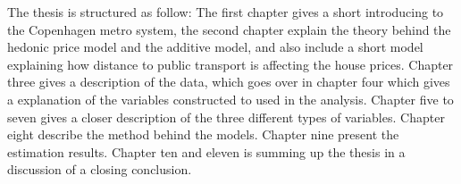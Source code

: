 The thesis is structured as follow: The first chapter gives a short introducing 
to the Copenhagen metro system, the second chapter explain the theory behind the
hedonic price model and the additive model, and also include a short model 
explaining how distance to public transport is affecting the house prices. 
Chapter three gives a description of the data, which goes over in chapter four
which gives a explanation of the variables constructed to used in the analysis. 
Chapter five to seven gives a closer description of the three different types of 
variables. Chapter eight describe the method behind the models. Chapter nine 
present the estimation results. Chapter ten and eleven is summing up the thesis 
in a discussion of a closing conclusion. 


   
